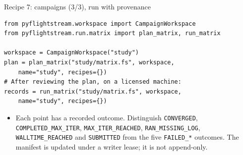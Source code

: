 \documentclass[aspectratio=169,10pt]{beamer}
\newcommand{\code}[1]{\texttt{\small #1}}
\begin{document}
\begin{frame}[fragile]{Recipe 7: campaigns (3/3), run with provenance}
\begin{lstlisting}
from pyflightstream.workspace import CampaignWorkspace
from pyflightstream.run.matrix import plan_matrix, run_matrix

workspace = CampaignWorkspace("study")
plan = plan_matrix("study/matrix.fs", workspace,
    name="study", recipes={})
# After reviewing the plan, on a licensed machine:
records = run_matrix("study/matrix.fs", workspace,
    name="study", recipes={})
\end{lstlisting}
  \begin{center}
  \end{center}
  \begin{itemize}
    \item Each point has a recorded outcome. Distinguish \code{CONVERGED},
        \code{COMPLETED\_MAX\_ITER}, \code{MAX\_ITER\_REACHED},
        \code{RAN\_MISSING\_LOG}, \code{WALLTIME\_REACHED} and \code{SUBMITTED}
        from the five \code{FAILED\_*} outcomes. The manifest is updated under
        a writer lease; it is not append-only.
  \end{itemize}
\end{frame}
\end{document}

